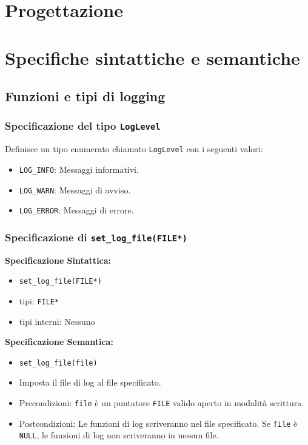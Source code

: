 \documentclass[11pt]{scrartcl} %
\begin{document}
\section{Progettazione}

\section{Specifiche sintattiche e semantiche}

\subsection{Funzioni e tipi di logging}

\subsubsection{Specificazione del tipo \texttt{LogLevel}}

Definisce un tipo enumerato chiamato \texttt{LogLevel} con i seguenti valori:
\begin{itemize}
	\item \texttt{LOG\_INFO}: Messaggi informativi.
	\item \texttt{LOG\_WARN}: Messaggi di avviso.
	\item \texttt{LOG\_ERROR}: Messaggi di errore.
\end{itemize}

\subsubsection{Specificazione di \texttt{set\_log\_file(FILE*)}}

\textbf{Specificazione Sintattica:}
\begin{itemize}
	\item \texttt{set\_log\_file(FILE*)}
	\item tipi: \texttt{FILE*}
	\item tipi interni: Nessuno
\end{itemize}

\textbf{Specificazione Semantica:}
\begin{itemize}
	\item \texttt{set\_log\_file(file)}
	\item Imposta il file di log al file specificato.
	\item Precondizioni: \texttt{file} è un puntatore \texttt{FILE} valido aperto in modalità scrittura.
	\item Postcondizioni: Le funzioni di log scriveranno nel file specificato. Se \texttt{file} è \texttt{NULL}, le funzioni di log non scriveranno in nessun file.
\end{itemize}
\end{document}
